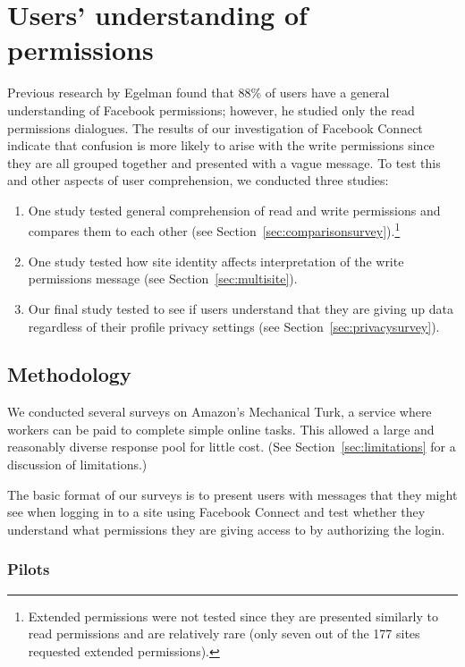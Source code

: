 \documentclass[10pt]{sig-alternate-10pt}
\begin{document}
\section{Users' understanding of permissions}
\label{sec:understanding}

Previous research  by Egelman \cite{egelman} found that 88\% of users have a general understanding of Facebook permissions; however, he studied only the read permissions dialogues. The results of our investigation of Facebook Connect indicate that confusion is more likely to arise with the write permissions since they are all grouped together and presented with a vague message. To test this and other aspects of user comprehension, we conducted three studies:

\begin{enumerate}
  \item One study tested general comprehension of read and write permissions and compares them to each other (see Section~\ref{sec:comparisonsurvey}).\footnote{Extended permissions were not tested since they are presented similarly to read permissions and are relatively rare (only seven out of the 177 sites requested extended permissions).} 
  \item One study tested how site identity affects interpretation of the write permissions message (see Section~\ref{sec:multisite}).
  \item Our final study tested to see if users understand that they are giving up data regardless of their profile privacy settings (see Section~\ref{sec:privacysurvey}).
\end{enumerate}

\subsection{Methodology}

We conducted several surveys on Amazon's Mechanical Turk, a service where workers can be paid to complete simple online tasks. This allowed a large and reasonably diverse response pool for little cost. (See Section~\ref{sec:limitations} for a discussion of limitations.)

The basic format of our surveys is to present users with messages that they might see when logging in to a site using Facebook Connect and test whether they understand what permissions they are giving access to by authorizing the login. 


\subsubsection{Pilots}
\end{document}
